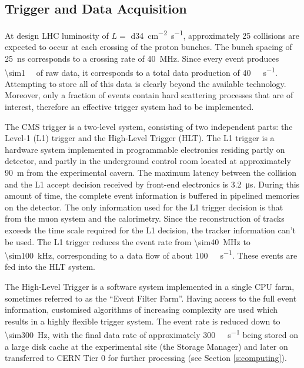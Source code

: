 \subsection{Trigger and Data Acquisition}
At design LHC luminosity of $L = $ \SI{d34}{\cm^{-2} s^{-1}}, approximately \num{25} collisions are expected to occur at
each crossing of the proton bunches. The bunch spacing of \SI{25}{\ns} corresponds to a crossing rate of
\SI{40}{\mega\hertz}. Since every event produces \SI{\sim1}{\mega\byte} of raw data, it corresponds to a total data
production of \SI{40}{\tera\byte\per\second}. Attempting to store all of this data is clearly beyond the available
technology. Moreover, only a fraction of events contain hard scattering processes that are of interest, therefore an
effective trigger system had to be implemented.

The CMS trigger is a two-level system, consisting of two independent parts: the Level-1 (L1) trigger and the High-Level
Trigger (HLT). The L1 trigger is a hardware system implemented in programmable electronics residing partly on detector,
and partly in the underground control room located at approximately \SI{90}{\metre} from the experimental cavern. The
maximum latency between the collision and the L1 accept decision received by front-end electronics is
\SI{3.2}{\micro\second}. During this amount of time, the complete event information is buffered in pipelined memories
on the detector. The only information used for the L1 trigger decision is that from the muon system and the calorimetry.
Since the reconstruction of tracks exceeds the time scale required for the L1 decision, the tracker information can't be
used. The L1 trigger reduces the event rate from \SI{\sim40}{\mega\hertz} to \SI{\sim100}{\kilo\hertz}, corresponding to
a data flow of about \SI{100}{\giga\byte\per\second}. These events are fed into the HLT system.

The High-Level Trigger is a software system implemented in a single CPU farm, sometimes referred to as the ``Event
Filter Farm''. Having access to the full event information, customised algorithms of increasing complexity are used
which results in a highly flexible trigger system. The event rate is reduced down to \SI{\sim300}{\Hz}, with the final
data rate of approximately \SI{300}{\mega\byte\per\second} being stored on a large disk cache at the experimental site
(the Storage Manager) and later on transferred to CERN Tier 0 for further processing (see Section \ref{s:computing}).

